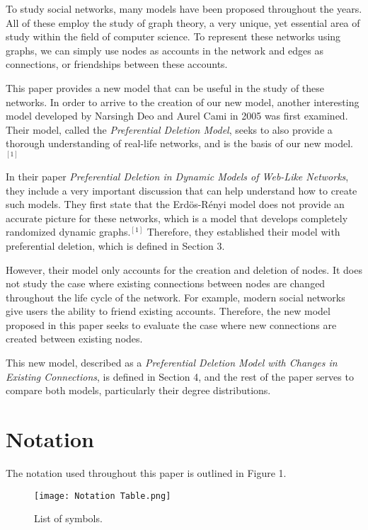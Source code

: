 \documentclass[final,3p,times,twocolumn]{elsarticle}
\begin{document}
To study social networks, many models have been proposed throughout the years. All of these employ the study of graph theory, a very unique, yet essential area of study within the field of computer science. To represent these networks using graphs, we can simply use nodes as accounts in the network and edges as connections, or friendships between these accounts.

This paper provides a new model that can be useful in the study of these networks. In order to arrive to the creation of our new model, another interesting model developed by Narsingh Deo and Aurel Cami in 2005 was first examined. Their model, called the \textit{Preferential Deletion Model}, seeks to also provide a thorough understanding of real-life networks, and is the basis of our new model.$^{[1]}$

In their paper \textit{Preferential Deletion in Dynamic Models of Web-Like Networks}, they include a very important discussion that can help understand how to create such models. They first state that the Erdös-Rényi model does not provide an accurate picture for these networks, which is a model that develops completely randomized dynamic graphs.$^{[1]}$ Therefore, they established their model with preferential deletion, which is defined in Section 3.

However, their model only accounts for the creation and deletion of nodes. It does not study the case where existing connections between nodes are changed throughout the life cycle of the network. For example, modern social networks give users the ability to friend existing accounts. Therefore, the new model proposed in this paper seeks to evaluate the case where new connections are created between existing nodes.

This new model, described as a \textit{Preferential Deletion Model with Changes in Existing Connections}, is defined in Section 4, and the rest of the paper serves to compare both models, particularly their degree distributions.

\section{Notation}
\label{S:2}

The notation used throughout this paper is outlined in Figure 1.

\begin{figure}[h]
\centering
\texttt{[image: Notation Table.png]}
\caption{List of symbols.}
\end{figure}
\end{document}
